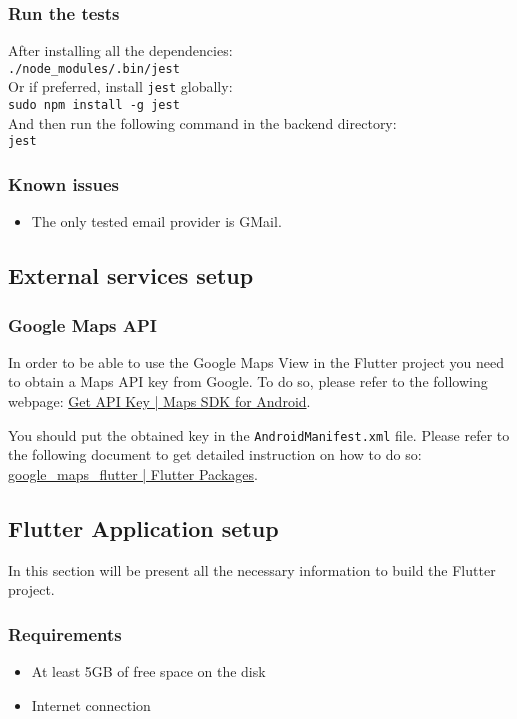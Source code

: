 \subsubsection{Run the tests}
After installing all the dependencies: \\
\texttt{./node\_modules/.bin/jest} \\
Or if preferred, install \texttt{jest} globally: \\
\texttt{sudo npm install -g jest}\\
And then run the following command in the backend directory: \\
\texttt{jest}


\subsubsection{Known issues}
\begin{itemize}
    \item The only tested email provider is GMail.
\end{itemize}

\subsection{External services setup}
\subsubsection{Google Maps API}
In order to be able to use the Google Maps View in the Flutter project you need to obtain a Maps API key from Google. To do so, please refer to the following webpage:
\href{https://developers.google.com/maps/documentation/android-sdk/signup}{Get API Key | Maps SDK for Android}.

You should put the obtained key in the \texttt{AndroidManifest.xml} file. Please refer to the following document to get detailed instruction on how to do so:
\href{https://pub.dartlang.org/packages/google_maps_flutter}{google\_maps\_flutter | Flutter Packages}.

\newpage
\subsection{Flutter Application setup}
In this section will be present all the necessary information to build the Flutter project.
\subsubsection{Requirements}
\begin{itemize}
\item At least 5GB of free space on the disk
    \item Internet connection
\end{itemize}

